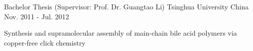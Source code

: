 \begin{cventries}
\cventry
{Bachelor Thesis (Supervisor: Prof. Dr. Guangtao Li)} %
{Tsinghua University} %
{China} %
{Nov. 2011 - Jul. 2012} %
{
  \begin{cvitems}
  \item Synthesis and supramolecular assembly of main-chain bile acid polymers via copper-free click chemistry
  \end{cvitems}
}
\end{cventries}
